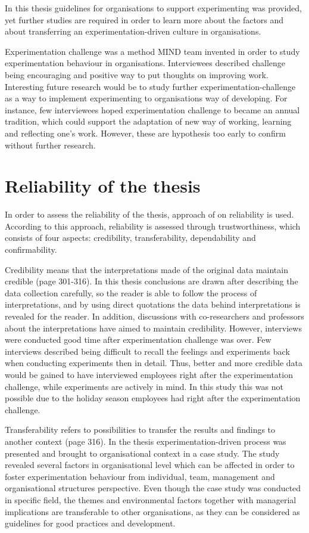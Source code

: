In this thesis guidelines for organisations to support experimenting was provided, yet further studies are required in order to learn more about the factors and about transferring an experimentation-driven culture in organisations. 

Experimentation challenge was a method MIND team invented in order to study experimentation behaviour in organisations. Interviewees described challenge being encouraging and positive way to put thoughts on improving work. Interesting future research would be to study further experimentation-challenge as a way to implement experimenting to organisations way of developing. For instance, few interviewees hoped experimentation challenge to became an annual tradition, which could support the adaptation of new way of working, learning and reflecting one's work. However, these are hypothesis too early to confirm without further research. 

\section{Reliability of the thesis}
In order to assess the reliability of the thesis, approach of \citet{lincoln1985naturalistic} on reliability is used. According to this approach, reliability is assessed through trustworthiness, which consists of four aspects: credibility, transferability, dependability and confirmability. 

Credibility means that the interpretations made of the original data maintain credible \citep{lincoln1985naturalistic} (page 301-316). In this thesis conclusions are drawn after describing the data collection carefully, so the reader is able to follow the process of interpretations, and by using direct quotations the data behind interpretations is revealed for the reader. In addition, discussions with co-researchers and professors about the interpretations have aimed to maintain credibility. However, interviews were conducted good time after experimentation challenge was over. Few interviews described being difficult to recall the feelings and experiments back when conducting experiments then in detail. Thus, better and more credible data would be gained to have interviewed employees right after the experimentation challenge, while experiments are actively in mind. In this study this was not possible due to the holiday season employees had right after the experimentation challenge. 

Transferability refers to possibilities to transfer the results and findings to another context \citep{lincoln1985naturalistic} (page 316). In the thesis experimentation-driven process was presented and brought to organisational context in a case study. The study revealed several factors in organisational level which can be affected in order to foster experimentation behaviour from individual, team, management and organisational structures perspective. Even though the case study was conducted in specific field, the themes and environmental factors together with managerial implications are transferable to other organisations, as they can be considered as guidelines for good practices and development. 

